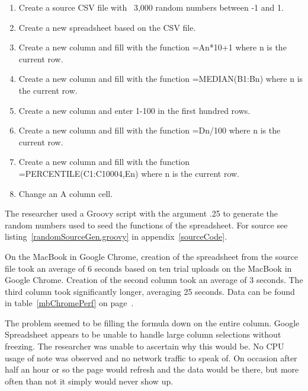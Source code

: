 \begin{enumerate}

\item Create a source CSV file with ~3,000 random numbers between -1 and 1.

\item Create a new spreadsheet based on the CSV file.

\item Create a new column and fill with the function =An*10+1 where n is the
  current row.

\item Create a new column and fill with the function =MEDIAN(B1:Bn) where n is
  the current row.

\item Create a new column and enter 1-100 in the first hundred rows.

\item Create a new column and fill with the function =Dn/100 where n is the
  current row.

\item Create a new column and fill with the function =PERCENTILE(C1:C10004,En)
  where n is the current row.

\item Change an A column cell.

\end{enumerate}

The researcher used a Groovy script with the argument .25 to generate the random
numbers used to seed the functions of the spreadsheet.  For source
see listing~\ref{randomSourceGen.groovy} in appendix~\ref{sourceCode}.

On the MacBook in Google Chrome, creation of the spreadsheet from the source
file took an average of 6 seconds based on ten trial uploads on the MacBook in
Google Chrome. Creation of the second column took an average of 3 seconds. The
third column took significantly longer, averaging 25 seconds. Data can be found
in table~\ref{mbChromePerf} on page~\pageref{mbChromePerf}.



The problem seemed to be filling the formula down on the entire column.  Google
Spreadsheet appears to be unable to handle large column selections without
freezing.  The researcher was unable to ascertain why this would be.  No CPU
usage of note was observed and no network traffic to speak of.  On occasion
after half an hour or so the page would refresh and the data would be there, but
more often than not it simply would never show up.

